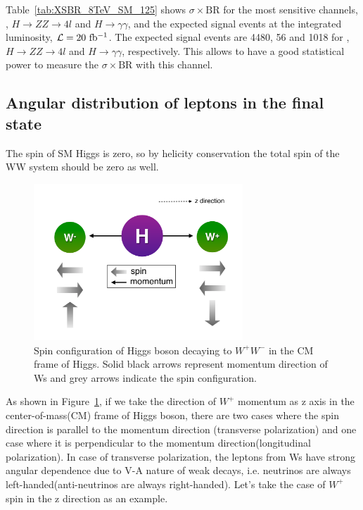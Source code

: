 Table~\ref{tab:XSBR_8TeV_SM_125} shows $\sigma \times \textrm{BR}$ for 
the most sensitive channels, \hww, $H \rightarrow ZZ\rightarrow 4l$
and $H \rightarrow\gamma\gamma$, and the expected signal events at
the integrated luminosity, $\mathcal{L}=20~\mathrm{fb^{-1}}$. The expected signal 
events are 4480, 56 and 1018 for \hww, $H \rightarrow ZZ\rightarrow 4l$
and $H \rightarrow\gamma\gamma$, respectively. This allows to have a 
good statistical power to measure the $\sigma \times \textrm{BR}$
with this channel. 

%
\subsection{Angular distribution of leptons in the final state}
\label{subsec:angular_dist}

The spin of SM Higgs is zero, so by helicity conservation the total spin 
of the WW system should be zero as well. 
\begin{figure}[htp]
\centering
\includegraphics[width=0.7\textwidth]{figures/HiggsSpin.pdf}
\caption{Spin configuration of Higgs boson decaying to $W^+W^-$ in the CM frame of Higgs.
Solid black arrows represent momentum direction of Ws and grey arrows indicate 
the spin configuration.}
\label{fig:HiggsSpin}
\end{figure}
As shown in Figure~\ref{fig:HiggsSpin}, if we take 
the direction of $W^+$ momentum as z axis in the center-of-mass(CM) frame of Higgs boson,
there are two cases where the spin direction is parallel to the 
momentum direction (transverse polarization) and one case where 
it is perpendicular to the momentum direction(longitudinal polarization). 
In case of transverse polarization, the leptons from Ws have strong 
angular dependence due to V-A nature of weak decays, i.e. neutrinos 
are always left-handed(anti-neutrinos are always right-handed). 
Let's take the case of $W^+$ spin in the z direction as an example.
